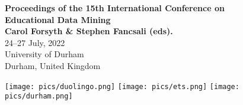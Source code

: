 \documentclass[letterpaper,11pt,oneside]{book} %
\begin{document}
\thispagestyle{empty}

\begin{center}
  \vspace*{55mm}
    {\bf
    \LARGE
    Proceedings of the 15th International Conference on \\ Educational Data Mining\\
    \vspace{1cm}
    \Large
    Carol Forsyth \& Stephen Fancsali (eds).
    \vspace{5cm}
    \hspace*{1cm}} \\ %
    \LARGE
    24--27 July, 2022\\
    University of Durham \\
    Durham, United Kingdom
  \end{center}
  
%
\vspace*{\fill}
\begin{center}
\texttt{[image: pics/duolingo.png]} \quad \texttt{[image: pics/ets.png]} \quad \texttt{[image: pics/durham.png]}  %
\end{center}

\clearpage
\end{document}
